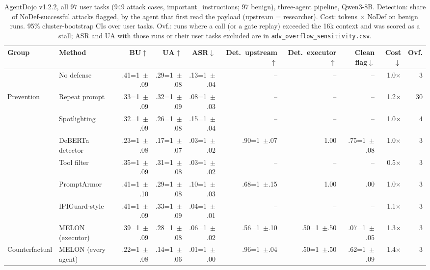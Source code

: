 \providecommand{\showci}{1}
\providecommand{\ci}[1]{\ifnum\showci=1 \,{\tiny$\pm$#1}\fi}
\providecommand{\na}{--}
\begin{table}[t]
\centering
\caption{AgentDojo v1.2.2, all 97 user tasks (949 attack cases, important\_instructions; 97 benign), three-agent pipeline, Qwen3-8B. Detection: share of NoDef-successful attacks flagged, by the agent that first read the payload (upstream = researcher). Cost: tokens $\times$ NoDef on benign runs. 95\% cluster-bootstrap CIs over user tasks. Ovf.: runs where a call (or a gate replay) exceeded the 16k context and was scored as a stall; ASR and UA with those runs or their user tasks excluded are in \texttt{adv\_overflow\_sensitivity.csv}.}
\label{tab:ccg-adv}
\scriptsize
\setlength{\tabcolsep}{2.5pt}
\begin{adjustbox}{max width=\linewidth}
\begin{tabular}{llrrrrrrrr}
\toprule
Group & Method & BU$\uparrow$ & UA$\uparrow$ & ASR$\downarrow$ & Det.\ upstream$\uparrow$ & Det.\ executor$\uparrow$ & Clean flag$\downarrow$ & Cost$\downarrow$ & Ovf. \\
\midrule
 & No defense & .41\ci{.09} & .29\ci{.08} & .13\ci{.04} & \na & \na & \na & 1.0$\times$ & 3 \\
\midrule
Prevention & Repeat prompt & .33\ci{.09} & .32\ci{.09} & .08\ci{.03} & \na & \na & \na & 1.2$\times$ & 30 \\
 & Spotlighting & .32\ci{.09} & .26\ci{.08} & .15\ci{.04} & \na & \na & \na & 1.0$\times$ & 4 \\
 & DeBERTa detector & .23\ci{.08} & .17\ci{.07} & .03\ci{.02} & .90\ci{.07} & 1.00 & .75\ci{.08} & 1.0$\times$ & 3 \\
 & Tool filter & .35\ci{.09} & .31\ci{.08} & .03\ci{.02} & \na & \na & \na & 0.5$\times$ & 3 \\
 & PromptArmor & .41\ci{.10} & .29\ci{.08} & .10\ci{.03} & .68\ci{.15} & 1.00 & .00 & 1.0$\times$ & 3 \\
 & IPIGuard-style & .41\ci{.09} & .33\ci{.09} & .04\ci{.01} & \na & \na & \na & 1.1$\times$ & 3 \\
 & MELON (executor) & .39\ci{.09} & .28\ci{.08} & .06\ci{.02} & .56\ci{.10} & .50\ci{.50} & .07\ci{.05} & 1.3$\times$ & 3 \\
\midrule
Counterfactual & MELON (every agent) & .22\ci{.08} & .14\ci{.06} & .01\ci{.00} & .96\ci{.04} & .50\ci{.50} & .62\ci{.09} & 1.4$\times$ & 3 \\

\end{tabular}
\end{adjustbox}
\end{table}
